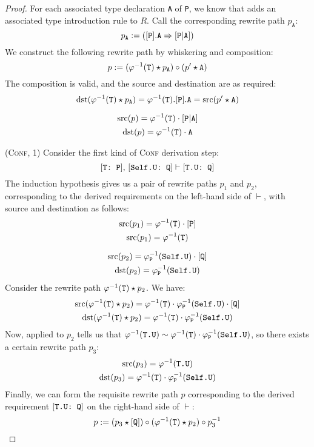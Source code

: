 \documentclass[../generics]{subfiles}
\begin{document}
\begin{proof}
For each associated type declaration \texttt{A} of \texttt{P}, we know that  adds an associated type introduction rule to $R$. Call the corresponding rewrite path $p_\texttt{A}$:
\[p_\texttt{A}:=([\texttt{P}].\texttt{A}\Rightarrow[\texttt{P}|\texttt{A}])\]
We construct the following rewrite path by whiskering and composition:
\[p:=(\varphi^{-1}(\texttt{T})\star p_\texttt{A})\circ(p^\prime \star \texttt{A})\]
The composition is valid, and the source and destination are as required:
\begin{gather*}
\operatorname{dst}(\varphi^{-1}(\texttt{T})\star p_\texttt{A})=\varphi^{-1}(\texttt{T}).[\texttt{P}].\texttt{A}=\operatorname{src}(p^\prime \star \texttt{A})\\[\medskipamount]
\operatorname{src}(p)=\varphi^{-1}(\texttt{T})\cdot[\texttt{P}|\texttt{A}]\\
\operatorname{dst}(p)=\varphi^{-1}(\texttt{T})\cdot\texttt{A}
\end{gather*}

(\textsc{Conf}, 1) Consider the first kind of \textsc{Conf} derivation step:
\[[\texttt{T:~P}],\,[\texttt{Self.U:~Q}]\vdash[\texttt{T.U:~Q}]\]
The induction hypothesis gives us a pair of rewrite paths $p_1$ and $p_2$, corresponding to the derived requirements on the left-hand side of $\vdash$, with source and destination as follows:
\begin{gather*}
\operatorname{src}(p_1)=\varphi^{-1}(\texttt{T})\cdot[\texttt{P}]\\
\operatorname{src}(p_1)=\varphi^{-1}(\texttt{T})\\[\medskipamount]
\operatorname{src}(p_2)=\varphi^{-1}_\texttt{P}(\texttt{Self.U})\cdot[\texttt{Q}]\\
\operatorname{dst}(p_2)=\varphi^{-1}_\texttt{P}(\texttt{Self.U})
\end{gather*}
Consider the rewrite path $\varphi^{-1}(\texttt{T})\star p_2$. We have:
\begin{gather*}
\operatorname{src}(\varphi^{-1}(\texttt{T})\star p_2)= \varphi^{-1}(\texttt{T})\cdot\varphi^{-1}_\texttt{P}(\texttt{Self.U})\cdot[\texttt{Q}]\\
\operatorname{dst}(\varphi^{-1}(\texttt{T})\star p_2)= \varphi^{-1}(\texttt{T})\cdot\varphi^{-1}_\texttt{P}(\texttt{Self.U})
\end{gather*}
Now,  applied to $p_2$ tells us that $\varphi^{-1}(\texttt{T.U})\sim\varphi^{-1}(\texttt{T})\cdot\varphi^{-1}_\texttt{P}(\texttt{Self.U})$, so there exists a certain rewrite path $p_3$:
\begin{gather*}
\operatorname{src}(p_3) = \varphi^{-1}(\texttt{T.U})\\
\operatorname{dst}(p_3) = \varphi^{-1}(\texttt{T})\cdot\varphi^{-1}_\texttt{P}(\texttt{Self.U})
\end{gather*}
Finally, we can form the requisite rewrite path $p$ corresponding to the derived requirement $[\texttt{T.U:~Q}]$ on the right-hand side of $\vdash$:
\[p := (p_3\star[\texttt{Q}]) \circ (\varphi^{-1}(\texttt{T})\star p_2) \circ p_3^{-1}\]


\end{proof}
\end{document}
